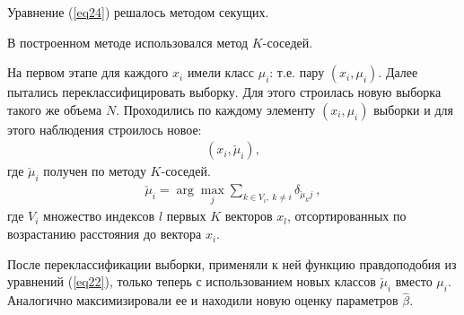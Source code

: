 Уравнение (\ref{eq24}) решалось методом секущих.

В построенном методе использовался метод $K$-соседей.

На первом этапе для каждого $x_i$ имели класс $\mu_i$: т.е. пару $(x_i,\mu_i)$.
Далее пытались переклассифицировать выборку. 
Для этого строилась новую выборка такого же объема $N$.
Проходились по каждому элементу $(x_i, \mu_i)$ выборки и для этого наблюдения строилось новое:
\begin{eqnarray}
    (x_i, \check{\mu}_i),
\end{eqnarray}
где $\check{\mu}_i$ получен по методу $K$-соседей.\hfill\break
\begin{eqnarray}
    \check{\mu}_i = \arg\max_j \sum_{k \in V_i,~k\neq i} \delta_{\check{\mu}_k j}~,
\end{eqnarray}
где $V_i$ множество индексов $l$ первых $K$ векторов $x_l$, отсортированных по возрастанию расстояния до вектора $x_i$.

После переклассификации выборки, применяли к ней функцию правдоподобия из уравнений (\ref{eq22}), только теперь с использованием новых классов $\check{\mu}_i$ вместо $\mu_i$. 
Аналогично максимизировали ее и находили новую оценку параметров $\hat{\beta}$.